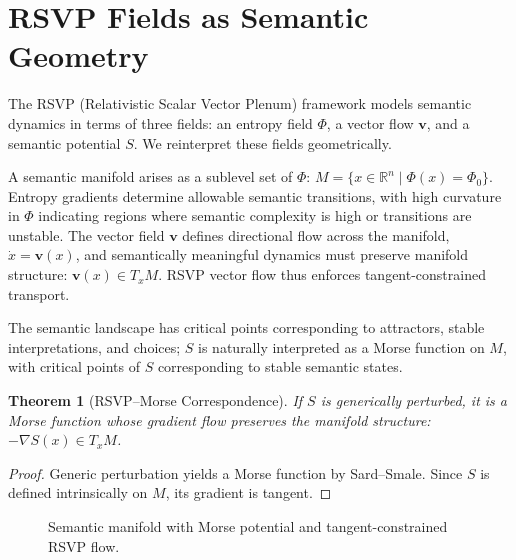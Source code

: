 \documentclass[11pt,a4paper,twocolumn]{article}
\newtheorem{theorem}{Theorem}[section]
\begin{document}
\section{RSVP Fields as Semantic Geometry}

The RSVP (Relativistic Scalar Vector Plenum) framework models semantic
dynamics in terms of three fields: an entropy field $\Phi$, a vector
flow $\mathbf{v}$, and a semantic potential $S$. We reinterpret these
fields geometrically.

A semantic manifold arises as a sublevel set of $\Phi$:
$M = \{ x \in \mathbb{R}^n \mid \Phi(x) = \Phi_0 \}$.
Entropy gradients determine allowable semantic transitions, with high
curvature in $\Phi$ indicating regions where semantic complexity is
high or transitions are unstable. The vector field $\mathbf{v}$ defines
directional flow across the manifold, $\dot{x} = \mathbf{v}(x)$, and
semantically meaningful dynamics must preserve manifold structure:
$\mathbf{v}(x) \in T_x M$. RSVP vector flow thus enforces
tangent-constrained transport.

The semantic landscape has critical points corresponding to attractors,
stable interpretations, and choices; $S$ is naturally interpreted as a
Morse function on $M$, with critical points of $S$ corresponding to
stable semantic states.

\begin{theorem}[RSVP--Morse Correspondence]
If $S$ is generically perturbed, it is a Morse function whose gradient
flow preserves the manifold structure: $-\nabla S(x) \in T_x M$.
\end{theorem}

\begin{proof}
Generic perturbation yields a Morse function by Sard--Smale. Since $S$
is defined intrinsically on $M$, its gradient is tangent.
\end{proof}

\begin{figure}[H]
\centering
{}
\caption{Semantic manifold with Morse potential and tangent-constrained RSVP flow.}
\end{figure}
\end{document}
